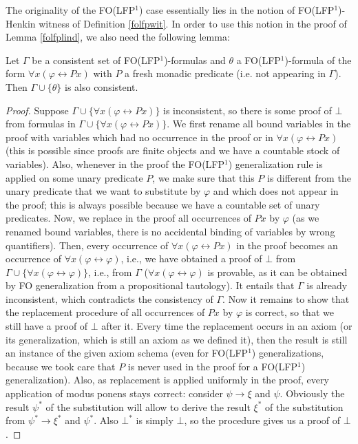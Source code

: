 \documentclass{LMCS}
\newcommand{\fo}{\textsf{FO}\xspace}
\newcommand{\folfp}{\textsf{FO(LFP$^1$)}\xspace}
\begin{document}
The originality of the \folfp case essentially lies in the notion of \folfp-Henkin witness of Definition \ref{folfpwit}. 
In order to use this notion in the proof of Lemma \ref{folfplind}, we also need the following lemma:



\begin{lem}
Let $\Gamma$ be a consistent set of \folfp-formulas and $\theta$ a
\folfp-formula of the form $\forall x (\varphi \leftrightarrow
Px)$ with $P$ a fresh monadic predicate (i.e. not appearing in
$\Gamma$). Then $\Gamma \cup \{\theta\}$ is also consistent.
\label{lemma6}
\end{lem}
\begin{proof}
Suppose $\Gamma \cup \{\forall x (\varphi \leftrightarrow Px)\}$
is inconsistent, so there is some proof of $\bot$ from formulas in
$\Gamma \cup \{\forall x(\varphi \leftrightarrow Px)\}$. We first
rename all bound variables in the proof with variables which had
no occurrence in the proof or in $\forall x(\varphi\leftrightarrow
Px)$ (this is possible since proofs are finite objects and we have
a countable stock of variables). Also, whenever in the proof the
\folfp generalization rule is applied on some unary predicate $P$,
we make sure that this $P$ is different from the unary predicate
that we want to substitute by $\varphi$ and which does not appear
in the proof; this is always possible because we have a countable
set of unary predicates. Now, we replace in the proof all
occurrences of $Px$ by $\varphi$ (as we renamed bound variables,
there is no accidental binding of variables by wrong quantifiers).
Then, every occurrence of $\forall x(\varphi \leftrightarrow Px)$
in the proof becomes an occurrence of $\forall x (\varphi
\leftrightarrow \varphi)$, i.e., we have obtained a proof of
$\bot$ from $\Gamma \cup \{\forall x(\varphi\leftrightarrow
\varphi)\}$, i.e., from $\Gamma$ ($\forall x (\varphi
\leftrightarrow \varphi)$ is provable, as it can be obtained by
\fo generalization from a propositional tautology). It
entails that $\Gamma$ is already inconsistent, which contradicts
the consistency of $\Gamma$. Now it remains to show that the
replacement procedure of all occurrences of $Px$ by $\varphi$ is
correct, so that we still have a proof of $\bot$ after it. Every
time the replacement occurs in an axiom (or its generalization,
which is still an axiom as we defined it), then the result is
still an instance of the given axiom schema (even for \folfp
generalizations, because we took care that $P$ is never used in
the proof for a \folfp generalization). Also, as replacement is
applied uniformly in the proof, every application of modus ponens
stays correct: consider $\psi \rightarrow \xi$ and $\psi$.
Obviously the result $\psi^*$ of the substitution will allow to
derive the result $\xi^*$ of the substitution from $\psi^*
\rightarrow \xi^*$ and $\psi^*$. Also $\bot^*$ is simply $\bot$,
so the procedure gives us a proof of $\bot$.
\end{proof}
\end{document}
